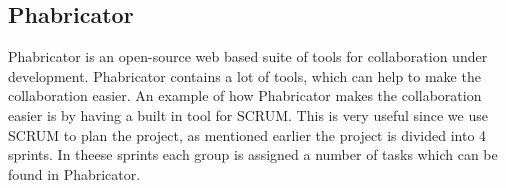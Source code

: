 \subsection{Phabricator}
Phabricator is an open-source web based suite of tools for collaboration under
development. Phabricator contains a lot of tools, which can help to make the
collaboration easier. An example of how Phabricator makes the collaboration
easier is by having a built in tool for SCRUM. This is very useful since we use
SCRUM to plan the project, as mentioned earlier the project is divided into 4
sprints. In theese sprints each group is assigned a number of tasks which can be
found in Phabricator. \cite{phabricator}
